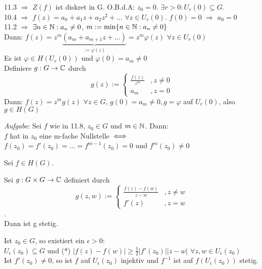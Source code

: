 \documentclass[a4paper,twoside,DIV15,BCOR12mm]{scrbook}
\begin{document}
\begin{beweis}
11.3 $\Rightarrow $ $Z(f)$ ist diskret in G. O.B.d.A: $z_0 = 0$. $\exists r > 0:
U_r(0) \subseteq G.$ \\
10.4 $\Rightarrow$ $f(z) = a_0 + a_1z + a_2 z^2 + \dots$ $\forall z \in U_r(0)$.
 $f(0) = 0 $ $\Rightarrow$ $a_0 = 0$ \\
11.2 $\Rightarrow $ $\exists n \in \mathbb{N}: a_n \neq 0$, $m := \min \{n \in \mathbb{N}:
a_n \neq 0\}$ \\
Dann: $f(z) = z^m \underbrace{(a_m + a_{m+1}z + \dots)}_{:= \varphi(z)} = z^m 
\varphi(z)$ $\forall z \in U_r(0)$ \\
Es ist $\varphi \in H(U_r(0))$ und $\varphi(0) = a_m \neq 0$ \\
Definiere $g: G \to \mathbb{C}$ durch 
\[g(z) := \begin{cases}
         	\frac{f(z)}{z^m} &, z \neq 0 \\
         	a_m              &, z = 0 
         \end{cases} \]
Dann: $f(z) = z^m g(z)$ $\forall z \in G$, $g(0) = a_m \neq 0, g = \varphi$ auf
$U_r(0)$, also $g \in H(G)$
\end{beweis}
\emph{Aufgabe}: Sei $f$ wie in 11.8, $z_0 \in G$ und $m \in \mathbb{N}$. Dann: \\ $f$
hat in $z_0$ eine m-fache Nullstelle $\iff$ $f(z_0) = f'(z_0) = \ldots =
f^{m-1}(z_0)=0$ und $f^m(z_0) \neq 0$
\begin{satz}
Sei $f \in H(G)$.
\begin{liste}
\item Sei $g: G \times G \to \mathbb{C}$ definiert durch 
\[g(z,w):= \begin{cases} 
           \frac{f(z)-f(w)}{z-w}&, z \neq w \\
           f'(z)&, z = w
           \end{cases}\]. \\
Dann ist g stetig.
\item Ist $z_0 \in G$, so existiert ein $\epsilon > 0$: \\ $ U_\epsilon(z_0)
\subseteq G$ und (*) $|f(z)-f(w)| \geq \frac{1}{2}|f'(z_0)||z-w|$ $\forall z, w
\in U_\epsilon(z_0)$ \\ Ist $f'(z_0) \neq 0$, so ist $f$ auf $U_\epsilon(z_0)$
injektiv und $f^{-1}$ ist auf $f(U_{\epsilon}(z_0))$ stetig.

\end{liste}
\end{satz}
\end{document}
